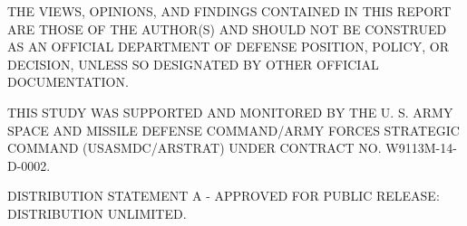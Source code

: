 \bigskip

\vfill

\begin{small}
\textsf{
THE VIEWS, OPINIONS, AND FINDINGS CONTAINED IN THIS REPORT ARE THOSE OF THE AUTHOR(S) AND SHOULD NOT BE CONSTRUED AS AN OFFICIAL DEPARTMENT OF DEFENSE POSITION, POLICY, OR DECISION, UNLESS SO DESIGNATED BY OTHER OFFICIAL DOCUMENTATION.
}

\textsf{
THIS STUDY WAS SUPPORTED AND MONITORED BY THE U. S. ARMY SPACE AND MISSILE DEFENSE COMMAND/ARMY FORCES STRATEGIC COMMAND (USASMDC/ARSTRAT) UNDER CONTRACT NO. W9113M-14-D-0002.
}

\textsf{
DISTRIBUTION STATEMENT A - APPROVED FOR PUBLIC RELEASE: DISTRIBUTION UNLIMITED.
}
\end{small}